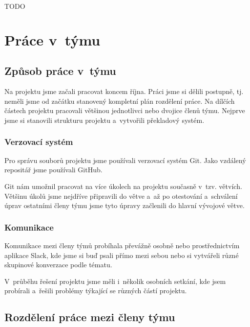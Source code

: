 \documentclass[a4paper, 11pt]{article}
\begin{document}
	TODO


	\section{Práce v~týmu}

	\subsection{Způsob práce v~týmu}

	Na projektu jsme začali pracovat koncem října. Práci jsme si dělili postupně, tj. neměli jsme od začátku
	stanovený kompletní plán rozdělení práce. Na dílčích částech projektu pracovali většinou jednotlivci nebo
	dvojice členů týmu. Nejprve jsme si stanovili strukturu projektu a~vytvořili překladový systém.

	\subsubsection{Verzovací systém}

	Pro správu souborů projektu jsme používali verzovací systém Git. Jako vzdálený repositář jsme používali \mbox{GitHub}.

	Git nám umožnil pracovat na více úkolech na projektu současně v~tzv. větvích. Většinu úkolů jsme nejdříve připravili
	do větve a~až po otestování a~schválení úprav ostatními členy týmu jsme tyto úpravy začlenili do hlavní
	vývojové větve.

	\subsubsection{Komunikace}

	Komunikace mezi členy týmů probíhala převážně osobně nebo prostřednictvím aplikace Slack, kde jsme si buď
	psali přímo mezi sebou nebo si vytvářeli různé skupinové konverzace podle tématu.

	V~průběhu řešení projektu jsme měli i~několik osobních setkání, kde jsem probírali a~řešili problémy
	týkající se různých částí projektu.


	\subsection{Rozdělení práce mezi členy týmu}
\end{document}
